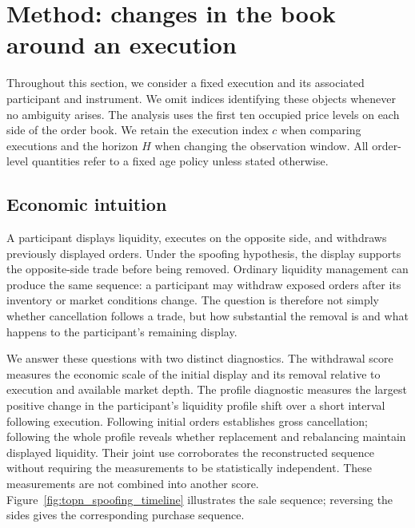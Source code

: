 \section{Method: changes in the book around an execution}
\label{sec:model}
Throughout this section, we consider a fixed execution and its associated participant and instrument. We omit indices identifying these objects whenever no ambiguity arises. The analysis uses the first ten occupied price levels on each side of the order book. We retain the execution index $c$ when comparing executions and the horizon $H$ when changing the observation window. All order-level quantities refer to a fixed age policy unless stated otherwise.

\subsection{Economic intuition}
A participant displays liquidity, executes on the opposite side, and withdraws previously displayed orders. Under the spoofing hypothesis, the display supports the opposite-side trade before being removed. Ordinary liquidity management can produce the same sequence: a participant may withdraw exposed orders after its inventory or market conditions change. The question is therefore not simply whether cancellation follows a trade, but how substantial the removal is and what happens to the participant's remaining display.

We answer these questions with two distinct diagnostics. The withdrawal score measures the economic scale of the initial display and its removal relative to execution and available market depth. The profile diagnostic measures the largest positive change in the participant's liquidity profile shift over a short interval following execution. Following initial orders establishes gross cancellation; following the whole profile reveals whether replacement and rebalancing maintain displayed liquidity. Their joint use corroborates the reconstructed sequence without requiring the measurements to be statistically independent. These measurements are not combined into another score. Figure~\ref{fig:topn_spoofing_timeline} illustrates the sale sequence; reversing the sides gives the corresponding purchase sequence.



